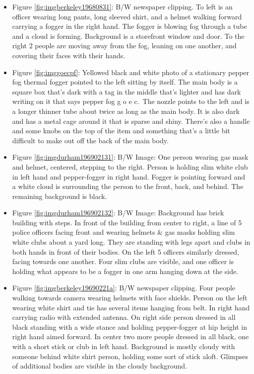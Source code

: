 \documentclass[
  11pt,
]{krantz}
\begin{document}
\begin{itemize}
\item
  Figure \ref{fig:imgberkeley19680831}: B/W newspaper clipping. To left is an officer wearing long pants, long sleeved shirt, and a helmet walking forward carrying a fogger in the right hand. The fogger is blowing fog through a tube and a cloud is forming. Background is a storefront window and door. To the right 2 people are moving away from the fog, leaning on one another, and covering their faces with their hands.
\item
  Figure \ref{fig:imggoecpf}: Yellowed black and white photo of a stationary pepper fog thermal fogger pointed to the left sitting by itself. The main body is a square box that's dark with a tag in the middle that's lighter and has dark writing on it that says pepper fog g o e c.~The nozzle points to the left and is a longer thinner tube about twice as long as the main body. It is also dark and has a metal cage around it that is sparse and shiny. There's also a handle and some knobs on the top of the item and something that's a little bit difficult to make out off the back of the main body.
\item
  Figure \ref{fig:imgdurham196902131}: B/W Image: One person wearing gas mask and helmet, centered, stepping to the right. Person is holding slim white club in left hand and pepper-fogger in right hand. Fogger is pointing forward and a white cloud is surrounding the person to the front, back, and behind. The remaining background is black.
\item
  Figure \ref{fig:imgdurham196902132}: B/W Image: Background has brick building with steps. In front of the building from center to right, a line of 5 police officers facing front and wearing helmets \& gas masks holding slim white clubs about a yard long. They are standing with legs apart and clubs in both hands in front of their bodies. On the left 5 officers similarly dressed, facing towards one another. Four slim clubs are visible, and one officer is holding what appears to be a fogger in one arm hanging down at the side.
\item
  Figure \ref{fig:imgberkeley19690221a}: B/W newspaper clipping. Four people walking towards camera wearing helmets with face shields. Person on the left wearing white shirt and tie has several items hanging from belt. In right hand carrying radio with extended antenna. On right side person dressed in all black standing with a wide stance and holding pepper-fogger at hip height in right hand aimed forward. In center two more people dressed in all black, one with a short stick or club in left hand. Background is mostly cloudy with someone behind white shirt person, holding some sort of stick aloft. Glimpses of additional bodies are visible in the cloudy background.

\end{itemize}
\end{document}
